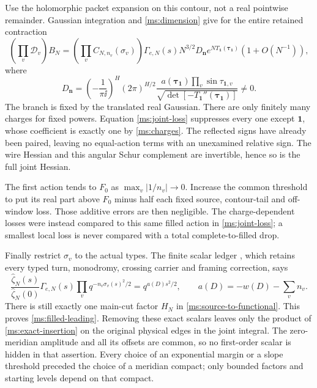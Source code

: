 Use the holomorphic packet expansion on this contour, not a real
pointwise remainder. Gaussian integration and
\eqref{ms:dimension} give for the entire retained contraction
\begin{equation}\label{ms:filled-packet}
 \left(\prod_v\mathcal D_v\right)B_N
 =\left(\prod_v C_{N,n_v}(\sigma_v)\right)
   \Gamma_{e,N}(s)N^{3/2}D_{\mathbf n}
   e^{N T_{\mathbf1}(\boldsymbol\tau_{\mathbf1})}
                         (1+O(N^{-1})),
\end{equation}
where
\[
 D_{\mathbf n}=\left(-\frac1{\pi\ii}\right)^H(2\pi)^{H/2}
 \frac{a(\boldsymbol\tau_{\mathbf1})\prod_v\sin\tau_{\mathbf1,v}}
 {\sqrt{\det[-T_{\mathbf1}''(\boldsymbol\tau_{\mathbf1})]}}\ne0.
\]
The branch is fixed by the translated real Gaussian. There are
only finitely many charges for fixed powers. Equation
\eqref{ms:joint-loss} suppresses every one except $\mathbf1$,
whose coefficient is exactly one by \eqref{ms:charges}. The
reflected signs have already been paired, leaving no equal-action
terms with an unexamined relative sign. The wire Hessian and this
angular Schur complement are invertible, hence so is the full
joint Hessian.

The first action tends to $F_0$ as $\max_v|1/n_v|\to0$.
Increase the common threshold to put its real part above $F_0$
minus half each fixed source, contour-tail and off-window loss.
Those additive errors are then negligible. The charge-dependent
losses were instead compared to this same filled action in
\eqref{ms:joint-loss}; a smallest local loss is never compared
with a total complete-to-filled drop.

Finally restrict $\sigma_v$ to the actual types. The finite scalar
ledger \cite[Proposition 8.1]{Meridian}, which retains every typed
turn, monodromy, crossing carrier and framing correction, says
\[
 \frac{\widehat\zeta_N(s)}{\widehat\zeta_N(0)}
 \Gamma_{e,N}(s)\prod_v q^{-n_v\sigma_v(s)^2/2}
                       =q^{a(D)s^2/2},\qquad
 a(D)=-w(D)-\sum_v n_v.
\]
There is still exactly one main-cut factor $H_N$ in
\eqref{ms:source-to-functional}. This proves
\eqref{ms:filled-leading}. Removing these exact scalars leaves
only the product of \eqref{ms:exact-insertion} on the original
physical edges in the joint integral. The zero-meridian amplitude
and all its offsets are common, so no first-order scalar is hidden
in that assertion. Every choice of an exponential margin or a
slope threshold preceded the choice of a meridian compact; only
bounded factors and starting levels depend on that compact.
